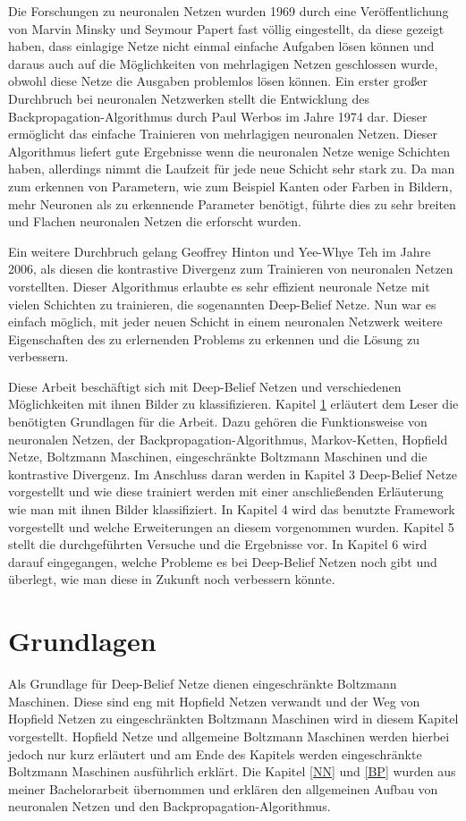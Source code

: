\documentclass[12pt]{article}
\begin{document}
	Die Forschungen zu neuronalen Netzen wurden 1969 durch eine Veröffentlichung von Marvin Minsky und Seymour Papert fast völlig eingestellt, da diese gezeigt haben, dass einlagige Netze nicht einmal einfache Aufgaben lösen können und daraus auch auf die Möglichkeiten von mehrlagigen Netzen geschlossen wurde, obwohl diese Netze die Ausgaben problemlos lösen können. Ein erster großer Durchbruch bei neuronalen Netzwerken stellt die Entwicklung des Backpropagation-Algorithmus durch Paul Werbos im Jahre 1974 dar. Dieser ermöglicht das einfache Trainieren von mehrlagigen neuronalen Netzen. Dieser Algorithmus liefert gute Ergebnisse wenn die neuronalen Netze wenige Schichten haben, allerdings nimmt die Laufzeit für jede neue Schicht sehr stark zu. Da man zum erkennen von Parametern, wie zum Beispiel Kanten oder Farben in Bildern, mehr Neuronen als zu erkennende Parameter benötigt, führte dies zu sehr breiten und Flachen neuronalen Netzen die erforscht wurden.
	
	Ein weitere Durchbruch gelang Geoffrey Hinton und Yee-Whye Teh im Jahre 2006, als diesen die kontrastive Divergenz zum Trainieren von neuronalen Netzen  vorstellten. Dieser Algorithmus erlaubte es sehr effizient neuronale Netze mit vielen Schichten zu trainieren, die sogenannten Deep-Belief Netze. Nun war es einfach möglich, mit jeder neuen Schicht in einem neuronalen Netzwerk weitere Eigenschaften des zu erlernenden Problems zu erkennen und die Lösung zu verbessern. 
	
	Diese Arbeit beschäftigt sich mit Deep-Belief Netzen und verschiedenen Möglichkeiten mit ihnen Bilder zu klassifizieren. Kapitel \ref{Grundlagen} erläutert dem Leser die benötigten Grundlagen für die Arbeit. Dazu gehören die Funktionsweise von neuronalen Netzen, der Backpropagation-Algorithmus, Markov-Ketten, Hopfield Netze, Boltzmann Maschinen, eingeschränkte Boltzmann Maschinen und die kontrastive Divergenz. Im Anschluss daran werden in Kapitel 3 Deep-Belief Netze vorgestellt und wie diese trainiert werden mit einer anschließenden Erläuterung wie man mit ihnen Bilder klassifiziert. In Kapitel 4 wird das benutzte Framework vorgestellt und welche Erweiterungen an diesem vorgenommen wurden. Kapitel 5 stellt die durchgeführten Versuche und die Ergebnisse vor. In Kapitel 6 wird darauf eingegangen, welche Probleme es bei Deep-Belief Netzen noch gibt und überlegt, wie man diese in Zukunft noch verbessern könnte. 

	\section{Grundlagen}
	\label{Grundlagen}
	Als Grundlage für Deep-Belief Netze dienen eingeschränkte Boltzmann Maschinen. Diese sind eng mit Hopfield Netzen verwandt und der Weg von Hopfield Netzen zu eingeschränkten Boltzmann Maschinen wird in diesem Kapitel vorgestellt. Hopfield Netze und allgemeine Boltzmann Maschinen werden hierbei jedoch nur kurz erläutert und am Ende des Kapitels werden eingeschränkte Boltzmann Maschinen ausführlich erklärt. Die Kapitel \ref{NN} und \ref{BP} wurden aus meiner Bachelorarbeit \cite{bachelor} übernommen und erklären den allgemeinen Aufbau von neuronalen Netzen und den Backpropagation-Algorithmus.
\end{document}

